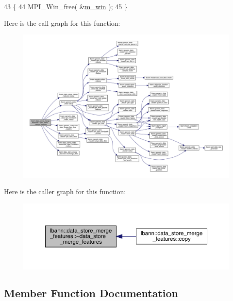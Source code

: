 \begin{DoxyCode}
43                                                       \{
44   MPI\_Win\_free( &\hyperlink{classlbann_1_1data__store__merge__features_a98f2c892955666c136ea4bb8aeba5e2b}{m\_win} );
45 \}
\end{DoxyCode}
Here is the call graph for this function\+:\nopagebreak
\begin{figure}[H]
\begin{center}
\leavevmode
\includegraphics[width=350pt]{classlbann_1_1data__store__merge__features_ade3b7b138376880121d16f40255e5f54_cgraph}
\end{center}
\end{figure}
Here is the caller graph for this function\+:\nopagebreak
\begin{figure}[H]
\begin{center}
\leavevmode
\includegraphics[width=350pt]{classlbann_1_1data__store__merge__features_ade3b7b138376880121d16f40255e5f54_icgraph}
\end{center}
\end{figure}


\subsection{Member Function Documentation}
\mbox{\label{classlbann_1_1data__store__merge__features_a00a6f7e1f07b5bc65d98c835925d1e08}} 
